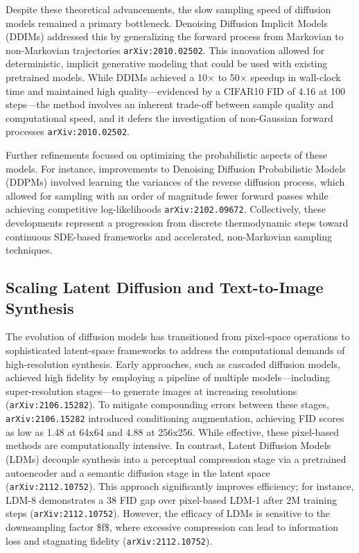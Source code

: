 \documentclass[11pt]{article}
\begin{document}
Despite these theoretical advancements, the slow sampling speed of diffusion models remained a primary bottleneck. Denoising Diffusion Implicit Models (DDIMs) addressed this by generalizing the forward process from Markovian to non-Markovian trajectories \texttt{arXiv:2010.02502}. This innovation allowed for deterministic, implicit generative modeling that could be used with existing pretrained models. While DDIMs achieved a 10× to 50× speedup in wall-clock time and maintained high quality—evidenced by a CIFAR10 FID of 4.16 at 100 steps—the method involves an inherent trade-off between sample quality and computational speed, and it defers the investigation of non-Gaussian forward processes \texttt{arXiv:2010.02502}.

Further refinements focused on optimizing the probabilistic aspects of these models. For instance, improvements to Denoising Diffusion Probabilistic Models (DDPMs) involved learning the variances of the reverse diffusion process, which allowed for sampling with an order of magnitude fewer forward passes while achieving competitive log-likelihoods \texttt{arXiv:2102.09672}. Collectively, these developments represent a progression from discrete thermodynamic steps toward continuous SDE-based frameworks and accelerated, non-Markovian sampling techniques.

\subsection{Scaling Latent Diffusion and Text-to-Image Synthesis}

The evolution of diffusion models has transitioned from pixel-space operations to sophisticated latent-space frameworks to address the computational demands of high-resolution synthesis. Early approaches, such as cascaded diffusion models, achieved high fidelity by employing a pipeline of multiple models—including super-resolution stages—to generate images at increasing resolutions (\texttt{arXiv:2106.15282}). To mitigate compounding errors between these stages, \texttt{arXiv:2106.15282} introduced conditioning augmentation, achieving FID scores as low as 1.48 at 64x64 and 4.88 at 256x256. While effective, these pixel-based methods are computationally intensive. In contrast, Latent Diffusion Models (LDMs) decouple synthesis into a perceptual compression stage via a pretrained autoencoder and a semantic diffusion stage in the latent space (\texttt{arXiv:2112.10752}). This approach significantly improves efficiency; for instance, LDM-8 demonstrates a 38 FID gap over pixel-based LDM-1 after 2M training steps (\texttt{arXiv:2112.10752}). However, the efficacy of LDMs is sensitive to the downsampling factor \$f\$, where excessive compression can lead to information loss and stagnating fidelity (\texttt{arXiv:2112.10752}).
\end{document}

